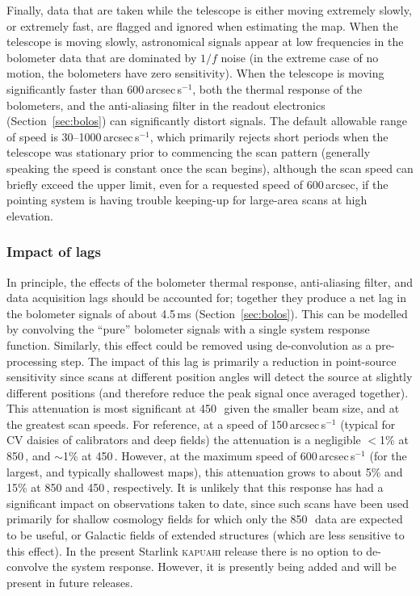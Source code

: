 \documentclass[useAMS,usenatbib,nofootinbib]{mn2e}
\begin{document}
Finally, data that are taken while the telescope is either moving
extremely slowly, or extremely fast, are flagged and ignored when
estimating the map. When the telescope is moving slowly, astronomical
signals appear at low frequencies in the bolometer data that are
dominated by $1/f$ noise (in the extreme case of no motion, the
bolometers have zero sensitivity). When the telescope is moving
significantly faster than 600\,arcsec\,s$^{-1}$, both the thermal
response of the bolometers, and the anti-aliasing filter in the
readout electronics (Section~\ref{sec:bolos}) can significantly
distort signals.  The default allowable range of speed is
30--1000\,arcsec\,s$^{-1}$, which primarily rejects short periods when
the telescope was stationary prior to commencing the scan pattern
(generally speaking the speed is constant once the scan begins),
although the scan speed can briefly exceed the upper limit, even for a
requested speed of 600\,arcsec, if the pointing system is having
trouble keeping-up for large-area scans at high elevation.


\subsubsection{Impact of lags}
\label{sec:lags}

In principle, the effects of the bolometer thermal response,
anti-aliasing filter, and data acquisition lags should be accounted
for; together they produce a net lag in the bolometer signals of about
4.5\,ms (Section~\ref{sec:bolos}). This can be modelled by convolving
the ``pure'' bolometer signals with a single system response
function. Similarly, this effect could be removed using de-convolution
as a pre-processing step. The impact of this lag is primarily a
reduction in point-source sensitivity since scans at different
position angles will detect the source at slightly different positions
(and therefore reduce the peak signal once averaged together). This
attenuation is most significant at 450\,\micron\ given the smaller
beam size, and at the greatest scan speeds. For reference, at a speed
of 150\,arcsec\,s$^{-1}$ (typical for CV daisies of calibrators and
deep fields) the attenuation is a negligible $<$1\% at 850\,\micron,
and $\sim$1\% at 450\,\micron. However, at the maximum speed of
600\,arcsec\,s$^{-1}$ (for the largest, and typically shallowest
maps), this attenuation grows to about 5\% and 15\% at 850 and
450\,\micron, respectively. It is unlikely that this response has had
a significant impact on observations taken to date, since such scans
have been used primarily for shallow cosmology fields for which only
the 850\,\micron\ data are expected to be useful, or Galactic fields
of extended structures (which are less sensitive to this effect). In
the present Starlink \textsc{kapuahi} release there is no option to
de-convolve the system response. However, it is presently being added
and will be present in future releases.
\end{document}
